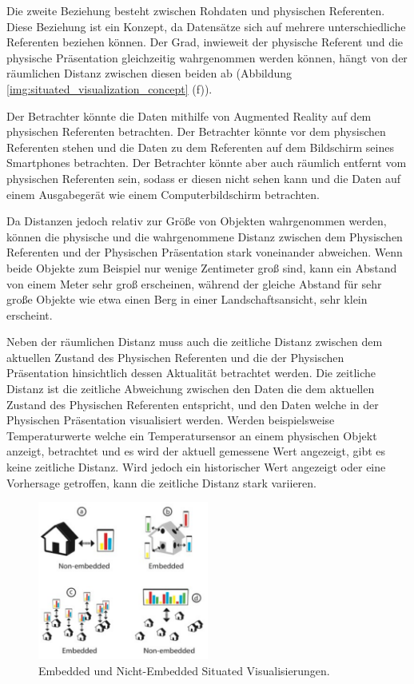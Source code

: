 Die zweite Beziehung besteht zwischen Rohdaten und physischen Referenten. Diese Beziehung ist ein Konzept, da Datensätze sich auf mehrere unterschiedliche Referenten beziehen können. 
Der Grad, inwieweit der physische Referent und die physische Präsentation gleichzeitig wahrgenommen werden können, hängt von der räumlichen Distanz zwischen diesen beiden ab (Abbildung \ref{img:situated_visualization_concept} (f)). 

Der Betrachter könnte die Daten mithilfe von Augmented Reality auf dem physischen Referenten betrachten. Der Betrachter könnte vor dem physischen Referenten stehen und die Daten zu dem Referenten auf
dem Bildschirm seines Smartphones betrachten. Der Betrachter könnte aber auch räumlich entfernt vom physischen Referenten sein, sodass er diesen nicht sehen kann und die Daten auf einem Ausgabegerät 
wie einem Computerbildschirm betrachten. 

\cite[S.~194]{Marriott2018} Da Distanzen jedoch relativ zur Größe von Objekten wahrgenommen werden, können die physische und die wahrgenommene Distanz zwischen dem Physischen Referenten und der Physischen Präsentation stark voneinander abweichen. Wenn beide Objekte zum Beispiel nur wenige Zentimeter groß sind, kann ein Abstand von einem Meter sehr groß erscheinen, während der gleiche Abstand für sehr große Objekte wie etwa einen Berg in einer Landschaftsansicht, sehr klein erscheint.


\cite{Willett2017} Neben der räumlichen Distanz muss auch die zeitliche Distanz zwischen dem aktuellen Zustand des Physischen Referenten und die der Physischen Präsentation hinsichtlich dessen 
Aktualität betrachtet werden. 
Die zeitliche Distanz ist die zeitliche Abweichung zwischen den Daten die dem aktuellen Zustand des Physischen Referenten entspricht, und den Daten welche in der Physischen Präsentation visualisiert werden.
Werden beispielsweise Temperaturwerte welche ein Temperatursensor an einem physischen Objekt anzeigt, betrachtet und es wird der aktuell gemessene Wert angezeigt, gibt es keine zeitliche Distanz. Wird jedoch ein
historischer Wert angezeigt oder eine Vorhersage getroffen, kann die zeitliche Distanz stark variieren.

\begin{figure}[H]
	\centering
	\includegraphics[width=0.5\textwidth]{resources/fundamentals/situated_visualization/embedded_visualization.png}
	\caption{Embedded und Nicht-Embedded Situated Visualisierungen. \cite[S.~195]{Marriott2018}}
	\label{img:embedded_visualization}
\end{figure}

